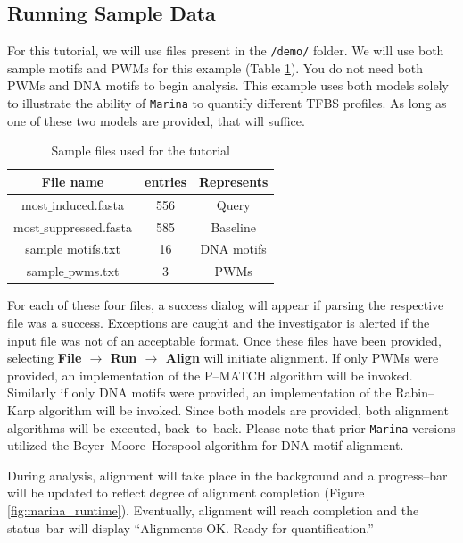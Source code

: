 \documentclass{article}
\begin{document}
\subsection{Running Sample Data}
For this tutorial, we will use files present in the \texttt{/demo/} folder.
We will use both sample motifs and PWMs for this example 
(Table \ref{table:sampleFiles}).
You do not need both PWMs and DNA motifs to begin analysis. This example
uses both models solely to illustrate the ability of \texttt{Marina} to
quantify different TFBS profiles. As long as one of these two models are
provided, that will suffice.

\begin{table}[htbc]
	\centering
	\begin{tabular}{|c|c|c|}
	\hline
		File name & entries & Represents \\ \hline
		most$\_$induced.fasta & 556 & Query \\
		most$\_$suppressed.fasta & 585 & Baseline \\
		sample$\_$motifs.txt & 16 & DNA motifs \\
		sample$\_$pwms.txt & 3 & PWMs \\
	\hline
	\end{tabular}
	\caption{Sample files used for the tutorial}
	\label{table:sampleFiles}
\end{table}

For each of these four files, a success dialog will appear if parsing the
respective file was a success. Exceptions are caught and the investigator is
alerted if the input file was not of an acceptable format. Once these files
have been provided, selecting 
\textbf{File $\rightarrow$ Run $\rightarrow$ Align} will initiate alignment.
If only PWMs were provided, an implementation of the P--MATCH algorithm will be
invoked. Similarly if only DNA motifs were provided, an implementation of the
Rabin--Karp algorithm will be invoked. Since both models are provided, both
alignment algorithms will be executed, back--to--back. Please note that 
prior \texttt{Marina} versions utilized the Boyer--Moore--Horspool algorithm 
for DNA motif alignment.

During analysis, alignment will take place in the background and a progress--bar
will be updated to reflect degree of alignment completion 
(Figure \ref{fig:marina_runtime}). Eventually, alignment will reach completion
and the status--bar will display ``Alignments OK. Ready for quantification.''
\end{document}
